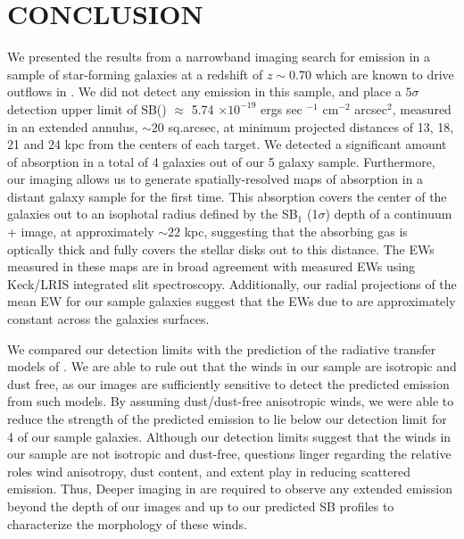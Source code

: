 \documentclass[twocolumn]{aastex61}
\begin{document}
\section{CONCLUSION}\label{sec:conclusion}
We presented the results from a narrowband imaging search for  emission in a sample of star-forming galaxies at a redshift of $z \sim 0.70$ which are known to drive outflows in  . We did not detect any  emission in this sample, and place a $5\sigma$ detection upper limit of SB() $\approx$ 5.74 $\times 10^{-19}$ ergs sec $^{-1}$ cm$^{-2}$ arcsec$^2$, measured in an extended annulus, $\sim 20$ sq.arcsec, at minimum projected distances of 13, 18, 21 and 24 kpc from the centers of each target. We detected a significant amount of  absorption in a total of 4 galaxies out of our 5 galaxy sample. Furthermore, our imaging allows us to generate spatially-resolved maps of  absorption in a distant galaxy sample for the first time. This absorption covers the center of the galaxies out to an isophotal radius defined by the SB$_1$ (1$\sigma$) depth of a continuum +  image, at approximately $\sim 22$ kpc, suggesting that the absorbing gas is optically thick and fully covers the stellar disks out to this distance. The EWs measured in these maps are in broad agreement with measured EWs using Keck/LRIS integrated slit spectroscopy. Additionally, our radial projections of the mean EW for our sample galaxies suggest that the EWs due to  are approximately constant across the galaxies surfaces. 

We compared our detection limits with the prediction of the radiative transfer models of \cite{Prochaska_2011}. We are able to rule out that the winds in our sample are isotropic and dust free, as our images are sufficiently sensitive to detect the predicted emission from such models. By assuming dust/dust-free anisotropic winds, we were able to reduce the strength of the predicted   emission to lie below our detection limit for 4 of our sample galaxies.  Although our detection limits suggest that the winds in our sample are not isotropic and dust-free, questions linger regarding the relative roles wind anisotropy, dust content, and extent play in reducing scattered emission. Thus, Deeper imaging in  are required to observe any extended emission beyond the depth of our images and up to our predicted SB profiles to characterize the morphology of these winds. 

\end{document}

